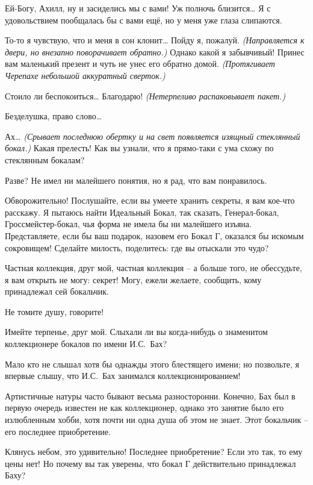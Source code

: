 \documentclass[../main.tex]{subfiles}
\begin{document}
\begin{dialogue}
 Ей-Богу, Ахилл, ну и засиделись мы с вами! Уж полночь близится\ldots{} Я с удовольствием пообщалась бы с вами ещё, но у меня уже глаза слипаются.

 То-то я чувствую, что и меня в сон клонит\ldots{} Пойду я, пожалуй. \emph{(Направляется к двери, но внезапно поворачивает обратно.)} Однако какой я забывчивый! Принес вам маленький презент и чуть не унес его обратно домой. \emph{(Протягивает Черепахе небольшой аккуратный сверток.)}

 {\Large С}тоило ли беспокоиться\ldots{} Благодарю! \emph{(Нетерпеливо распаковывает пакет.)}

 {\Large Б}езделушка, право слово\ldots{}

 Ах\ldots{} \emph{(Срывает последнюю обертку и на свет появляется изящный стеклянный бокал.)} Какая прелесть! Как вы узнали, что я прямо-таки с ума схожу по стеклянным бокалам?

 Разве? Не имел ни малейшего понятия, но я рад, что вам понравилось.

 Обворожительно! Послушайте, если вы умеете хранить секреты, я вам кое-что расскажу. Я пытаюсь найти Идеальный Бокал, так сказать, Генерал-бокал, Гроссмейстер-бокал, чья форма не имела бы ни малейшего изъяна. Представляете, если бы ваш подарок, назовем его Бокал Г, оказался бы искомым сокровищем! Сделайте милость, поделитесь: где вы отыскали это чудо?

 Частная коллекция, друг мой, частная коллекция \--- а больше того, не обессудьте, я вам открыть не могу: секрет! Могу, ежели желаете, сообщить, кому принадлежал сей бокальчик.

 Не томите душу, говорите!

 Имейте терпенье, друг мой. Слыхали ли вы когда-нибудь о знаменитом коллекционере бокалов по имени И.С.~Бах?

 Мало кто не слышал хотя бы однажды этого блестящего имени; но позвольте, я впервые слышу, что И.С.~Бах занимался коллекционированием!

 {\Large А}ртистичные натуры часто бывают весьма разносторонни. Конечно, Бах был в первую очередь известен не как коллекционер, однако это занятие было его излюбленным хобби, хотя почти ни одна душа об этом не знает. Этот бокальчик \--- его последнее приобретение.

 Клянусь небом, это удивительно! Последнее приобретение? Если это так, то ему цены нет! Но почему вы так уверены, что бокал Г действительно принадлежал Баху?


\end{dialogue}
\end{document}
